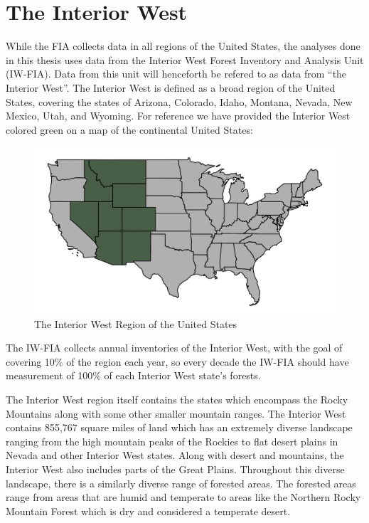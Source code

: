 \documentclass[12pt,twoside]{reedthesis}
\begin{document}
\hypertarget{the-interior-west}{%
\section{The Interior West}\label{the-interior-west}}

While the FIA collects data in all regions of the United States, the analyses done in this thesis uses data from the Interior West Forest Inventory and Analysis Unit (IW-FIA). Data from this unit will henceforth be refered to as data from ``the Interior West''. The Interior West is defined as a broad region of the United States, covering the states of Arizona, Colorado, Idaho, Montana, Nevada, New Mexico, Utah, and Wyoming. For reference we have provided the Interior West colored green on a map of the continental United States:
\begin{figure}

{\centering \includegraphics[width=1\linewidth]{figure/interior-west-on-usa} 

}

\caption{The Interior West Region of the United States}\label{fig:unnamed-chunk-3}
\end{figure}
The IW-FIA collects annual inventories of the Interior West, with the goal of covering 10\% of the region each year, so every decade the IW-FIA should have measurement of 100\% of each Interior West state's forests.

The Interior West region itself contains the states which encompass the Rocky Mountains along with some other smaller mountain ranges. The Interior West contains 855,767 square miles of land which has an extremely diverse landscape ranging from the high mountain peaks of the Rockies to flat desert plains in Nevada and other Interior West states. Along with desert and mountains, the Interior West also includes parts of the Great Plains. Throughout this diverse landscape, there is a similarly diverse range of forested areas. The forested areas range from areas that are humid and temperate to areas like the Northern Rocky Mountain Forest which is dry and considered a temperate desert.
\end{document}
